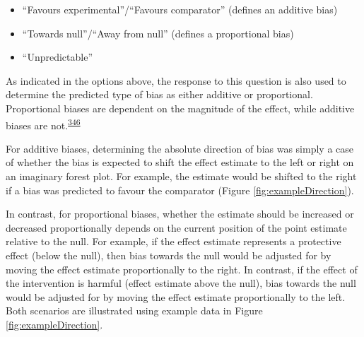 \documentclass[a4paper, twoside]{templates/ociamthesis}
\providecommand{\tightlist}{%
  \setlength{\itemsep}{0pt}\setlength{\parskip}{0pt}}
\begin{document}
\begin{itemize}
\tightlist
\item
  ``Favours experimental''/``Favours comparator'' (defines an additive bias)
\item
  ``Towards null''/``Away from null'' (defines a proportional bias)
\item
  ``Unpredictable''
\end{itemize}

As indicated in the options above, the response to this question is also used to determine the predicted type of bias as either additive or proportional. Proportional biases are dependent on the magnitude of the effect, while additive biases are not.\textsuperscript{\protect\hyperlink{ref-turner2009}{346}}

For additive biases, determining the absolute direction of bias was simply a case of whether the bias is expected to shift the effect estimate to the left or right on an imaginary forest plot. For example, the estimate would be shifted to the right if a bias was predicted to favour the comparator (Figure \ref{fig:exampleDirection}).

In contrast, for proportional biases, whether the estimate should be increased or decreased proportionally depends on the current position of the point estimate relative to the null. For example, if the effect estimate represents a protective effect (below the null), then bias towards the null would be adjusted for by moving the effect estimate proportionally to the right. In contrast, if the effect of the intervention is harmful (effect estimate above the null), bias towards the null would be adjusted for by moving the effect estimate proportionally to the left. Both scenarios are illustrated using example data in Figure \ref{fig:exampleDirection}.
\end{document}
